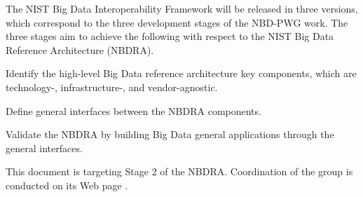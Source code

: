 The NIST Big Data Interoperability Framework will be released in three
versions, which correspond to the three development stages of the
NBD-PWG work. The three stages aim to achieve the following with
respect to the NIST Big Data Reference Architecture (NBDRA).

\begin{description}
\item \item[Stage 1:] Identify the high-level Big Data reference architecture
  key components, which are technology-, infrastructure-, and
  vendor-agnostic.
\item \item[Stage 2:] Define general interfaces between the NBDRA components.
\item \item[Stage 3:] Validate the NBDRA by building Big Data general
  applications through the general interfaces.
\end{description}

This document is targeting Stage 2 of the NBDRA. Coordination of the
group is conducted on its Web page \cite{www-nbdwg}. 
